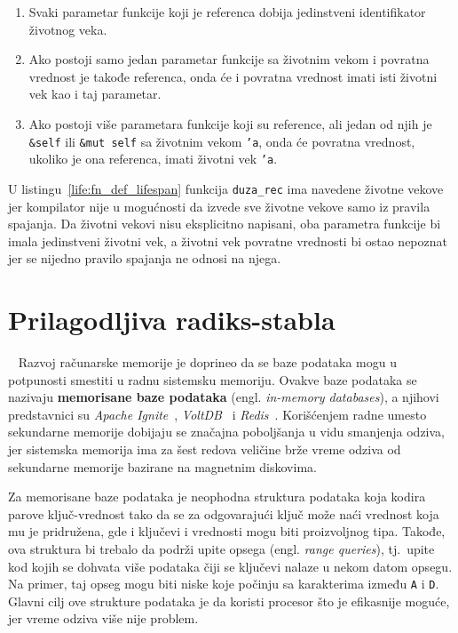 \documentclass[12pt,oneside]{memoir}
\begin{document}
\begin{enumerate}
  \item Svaki parametar funkcije koji je referenca dobija jedinstveni identifikator
        životnog veka.
  \item Ako postoji samo jedan parametar funkcije sa životnim vekom i povratna vrednost je
        takođe referenca, onda
        će i povratna vrednost imati isti životni vek kao i taj parametar.
  \item Ako postoji više parametara funkcije koji su reference, ali jedan od
        njih je \texttt{\&self} ili \texttt{\&mut self} sa životnim vekom \texttt{'a},
        onda će povratna vrednost, ukoliko je ona referenca, imati životni vek
        \texttt{'a}.
\end{enumerate}

U listingu~\ref{life:fn_def_lifespan} funkcija \texttt{duza\_rec} ima navedene životne
vekove jer kompilator nije u mogućnosti da izvede sve životne vekove samo iz
pravila spajanja. Da životni vekovi nisu eksplicitno napisani, oba parametra funkcije
bi imala jedinstveni životni vek, a životni vek povratne vrednosti bi ostao nepoznat
jer se nijedno pravilo spajanja ne odnosi na njega.


\chapter{Prilagodljiva radiks-stabla}~\label{ch:art}
Razvoj računarske memorije je doprineo da se baze podataka
mogu u potpunosti smestiti u radnu sistemsku memoriju. Ovakve baze podataka se nazivaju
\textbf{memorisane baze podataka} (engl. \emph{in-memory databases}), a njihovi predstavnici su
\emph{Apache Ignite}~\cite{apacheIgnite}, \emph{VoltDB}~\cite{voltDB} i
\emph{Redis}~\cite{redis}. Korišćenjem radne umesto sekundarne
memorije dobijaju se značajna poboljšanja u vidu smanjenja odziva, jer sistemska memorija
ima za šest redova veličine brže vreme odziva
od sekundarne memorije bazirane na magnetnim diskovima.

Za memorisane baze podataka je neophodna struktura podataka koja kodira parove
ključ-vrednost tako da se za odgovarajući ključ može naći vrednost koja mu
je pridružena, gde i ključevi i vrednosti mogu biti proizvoljnog tipa.
Takođe, ova struktura bi trebalo da podrži upite opsega
(engl. \emph{range queries}), tj.\ upite kod kojih se dohvata više podataka
čiji se ključevi nalaze u nekom datom opsegu.
Na primer, taj opseg mogu biti niske koje počinju sa karakterima između
\texttt{A} i \texttt{D}.
Glavni cilj ove strukture podataka je da koristi procesor što je efikasnije moguće, jer
vreme odziva više nije problem.
\end{document}

